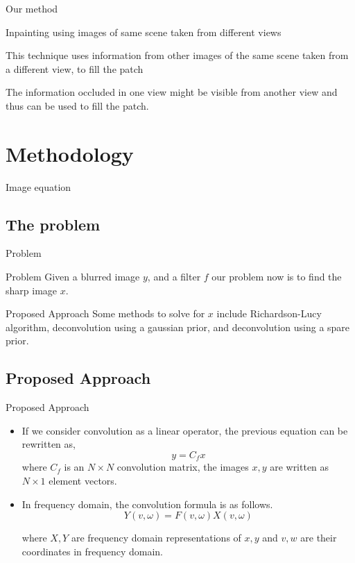 \documentclass{beamer}
\begin{document}
\begin{frame}{Our method}
\item {
  Inpainting using images of same scene taken from different views \cite{6}
  }
   \item {This technique uses information from other images of the same scene taken from a different view, to fill the patch}
    \item {The information occluded in one view might be visible from another view and thus can be used to fill the patch.}
\end{frame}
\section{Methodology}

\begin{frame}{Image equation}

\end{frame}

\subsection{The problem}

\begin{frame}{Problem}
\begin{block}{Problem}
Given a blurred image $y$, and a filter $f$ our problem now is to find the sharp image $x$.
\end{block}
\pause
\begin{block}{Proposed Approach}
Some methods to solve for $x$ include Richardson-Lucy algorithm, deconvolution using a gaussian prior, and deconvolution using a spare prior.
\end{block}

\end{frame}

\subsection{Proposed Approach}
\begin{frame}{Proposed Approach}
  \begin{itemize}
  \item {
    If we consider convolution as a linear operator, the previous equation can be rewritten as,
\begin{equation}
y = C_fx
\end{equation} 
where $C_f$  is an $N \times N$ convolution matrix, the images $x,y$ are written as $N \times 1$ element vectors.
    
    \pause %
  }
  \item {   
    In frequency domain, the convolution formula is as follows. 
\begin{equation}
Y(v,\omega) = F(v,\omega)X(v,\omega)
\end{equation}

where $X, Y$ are frequency domain representations of $x, y$ and $v, w$ are their coordinates in frequency domain.
  }
  \end{itemize}
\end{frame}
\end{document}
